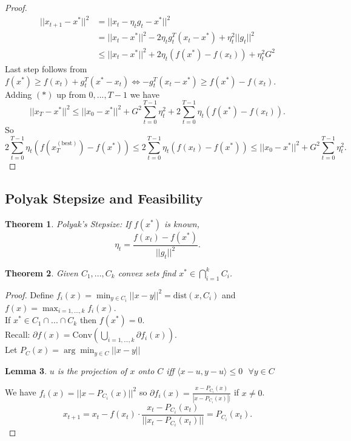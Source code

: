 \documentclass[a4paper]{article}
\newtheorem{thm}{Theorem}[section]
\newtheorem{lem}[thm]{Lemma}
\begin{document}
\begin{proof}
    \begin{align*}
        ||x_{t+1}-x^*||^2&=||x_t-\eta_tg_t -x^*||^2\\
        &=||x_t-x^*||^2-2\eta_t g_t^T(x_t-x^*)+\eta_t^2||g_t||^2\\
        &\leq ||x_t-x^*||^2+2\eta_t (f(x^*)-f(x_t))+\eta_t^2G^2 \tag{*}
    \end{align*}
    Last step follows from $f(x^*)\geq f(x_t)+g_t^T(x^*-x_t)\iff -g_t^T(x_t-x^*)\geq f(x^*)-f(x_t)$.\\
    Adding $(*)$ up from $0,...,T-1$ we have \[
    ||x_T-x^*||^2 \leq ||x_0-x^*||^2+G^2 \sum_{t=0}^{T-1}\eta_t^2+2\sum_{t=0}^{T-1}\eta_t \left( f(x^*)-f(x_t) \right)
    .\] 
    So \[
    2\sum_{t=0}^{T-1}\eta_t \left( f(x_T^{\mathrm{(best)}})-f(x^*) \right)\leq2\sum_{t=0}^{T-1}\eta_t \left( f(x_t)-f(x^*) \right)\leq ||x_0-x^*||^2+G^2 \sum_{t=0}^{T-1}\eta_t^2
    .\] 
\end{proof}

\subsection{Polyak Stepsize and Feasibility}
\begin{thm}
    Polyak's Stepsize: If $f(x^*)$ is known, \[
    \eta_t = \frac{f(x_t)-f(x^*)}{||g_t||^2}
    .\] 
\end{thm}
\begin{thm}
    Given $C_1,...,C_k$ convex sets find $x^*\in \bigcap_{i=1}^k C_i$. 
\end{thm}
\begin{proof}
    Define $f_i(x)=\min_{y\in C_i}||x-y||^2=\mathrm{dist}(x,C_i)$ and $f(x)=\max_{i=1,...,k}f_i(x).$\\
    If $x^*\in C_1\cap ... \cap C_k$ then $f(x^*)=0$. \\
    Recall: $\partial f(x)=\mathrm{Conv} \left(  \bigcup_{i=1,...,k} \partial f_i(x) \right)$. \\
    Let $P_C(x)=\arg\min_{y\in C}||x-y||$ 
    \begin{lem}
        $u$ is the projection of $x$ onto $C$ iff $\langle x-u,y-u\rangle \leq 0 \text{ }\forall y\in C$
    \end{lem} 
    We have $f_i(x)=||x-P_{C_i}(x)||^2$ so $\partial f_i(x)=\frac{x-P_{C_i}(x)}{|x-P_{C_i}(x)||}$ if $x\neq 0$.
    \[
    x_{t+1}=x_t-f(x_t) \cdot \frac{x_t-P_{C_i}(x_t)}{||x_t-P_{C_i}(x_t)||}=P_{C_i}(x_t)
    .\] 
\end{proof}
\newpage
\end{document}
